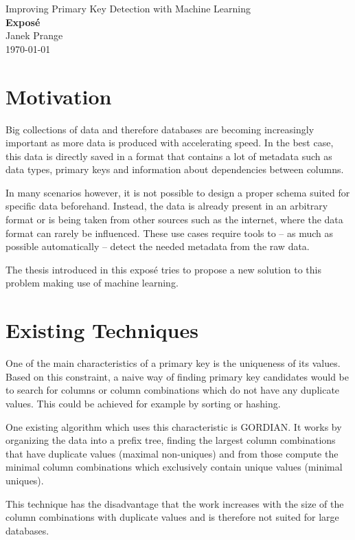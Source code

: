 \documentclass[a4paper]{article}
\begin{document}
\thispagestyle{firstpagestyle}
\begin{center}
  \huge Improving Primary Key Detection with Machine Learning\\[8pt]
  \Large \textbf{Exposé}\\[10pt]
  \normalsize Janek Prange\\
  \today
\end{center}

\section{Motivation}
Big collections of data and therefore databases are becoming increasingly important as more data is produced with accelerating speed. In the best case, this data is directly saved in a format that contains a lot of metadata such as data types, primary keys and information about dependencies between columns.

In many scenarios however, it is not possible to design a proper schema suited for specific data beforehand. Instead, the data is already present in an arbitrary format or is being taken from other sources such as the internet, where the data format can rarely be influenced. These use cases require tools to -- as much as possible automatically -- detect the needed metadata from the raw data. %

The thesis introduced in this exposé tries to propose a new solution to this problem making use of machine learning.


\section{Existing Techniques}\label{sec:naiveProcedures}
One of the main characteristics of a primary key is the uniqueness of its values. Based on this constraint, a naive way of finding primary key candidates would be to search for columns or column combinations which do not have any duplicate values. This could be achieved for example by sorting or hashing.

One existing algorithm which uses this characteristic is GORDIAN. It works by organizing the data into a prefix tree, finding the largest column combinations that have duplicate values (maximal non-uniques) and from those compute the minimal column combinations which exclusively contain unique values (minimal uniques).

This technique has the disadvantage that the work increases with the size of the column combinations with duplicate values and is therefore not suited for large databases.
\end{document}

